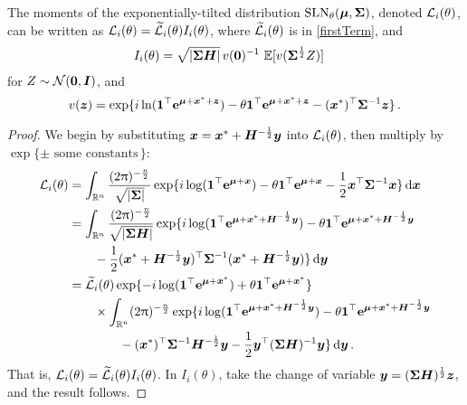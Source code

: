 \begin{subappendices}
\begin{proposition} \label{prop:laplace_derivatives}
The moments of the exponentially-tilted distribution $\mathrm{SLN}_\theta(\bm{\mu}, \bm{\Sigma})$, denoted $\mathcal{L}_i(\theta)$, can be written as $\mathcal{L}_i(\theta) = \widetilde{\mathcal{L}}_i(\theta) I_i(\theta)$, where $\widetilde{\mathcal{L}}_i(\theta)$ is in \eqref{firstTerm}, and
\begin{align*}
	I_i(\theta) &= \sqrt{|\bm{\Sigma} \bm{H}|} \, v(\bm{0})^{-1} \, \operatorname{{\mathbb E}}[v(\bm{\Sigma}^{\frac12} Z)]
\end{align*}
for $Z \sim \mathcal{N}(\bm{0}, \bm{I})$, and
\[ v(\bm{z}) = \exp\{ i \ln(\bm{1}^\top \bm{\mathrm{e}}^{\bm{\mu} + \bm{x}^* + \bm{z}}) - \theta \bm{1}^\top \bm{\mathrm{e}}^{\bm{\mu} + \bm{x}^* + \bm{z}} - (\bm{x}^*)^\top \bm{\Sigma}^{-1} \bm{z} \} \,. \]
\end{proposition}
\begin{proof}
We begin by substituting $\bm{x} = \bm{x}^* + \bm{H}^{-\frac12} \bm{y}$ into $\mathcal{L}_i(\theta)$, then multiply by $\exp\{ \pm \text{ some constants}\,\}$:
\begin{align*}
	\Laplace_i(\theta) &= \int_{\RL^n} \frac{ (2\pi)^{-\frac{n}{2}} }{\sqrt{|\bfSigma|}} \exp\{ i \log(\bfone^\tr \ve^{\bfmu + \bfx}) - \theta \bfone^\tr \ve^{\bfmu + \bfx} - \frac12 \bfx^\tr \bfSigma^{-1} \bfx \}  \dif \bfx \\
	&= \int_{\RL^n} \frac{ (2\pi)^{-\frac{n}{2}} }{\sqrt{|\bfSigma \bfH|}} \exp\{ i \log(\bfone^\tr \ve^{\bfmu + \bfx^* + \bfH^{-\frac12} \bfy}) - \theta \bfone^\tr \ve^{\bfmu + \bfx^* + \bfH^{-\frac12} \bfy} \\
	&\qquad - \frac12 (\bfx^* + \bfH^{-\frac12} \bfy)^\tr \bfSigma^{-1} (\bfx^* + \bfH^{-\frac12} \bfy) \}  \dif \bfy \\
	&= \widetilde{\Laplace}_i(\theta) \exp\{ -i \log(\bfone^\tr \ve^{\bfmu + \bfx^*}) + \theta \bfone^\tr \ve^{\bfmu + \bfx^*} \} \\
	&\qquad \times \int_{\RL^n} (2\pi)^{-\frac{n}{2}} \exp\{ i \log(\bfone^\tr \ve^{\bfmu + \bfx^* + \bfH^{-\frac12} \bfy}) - \theta \bfone^\tr \ve^{\bfmu + \bfx^* + \bfH^{-\frac12} \bfy} \\
	&\qquad\qquad -(\bfx^*)^\tr \bfSigma^{-1} \bfH^{-\frac12} \bfy - \frac12 \bfy^\tr (\bfSigma \bfH)^{-1} \bfy \}  \dif \bfy \,.
\end{align*}
That is, $\mathcal{L}_i(\theta) = \widetilde{\mathcal{L}}_i(\theta) I_i(\theta)$. In $I_i(\theta)$, take the change of variable $\bm{y} = (\bm{\Sigma}\bm{H})^{\frac12} \bm{z}$, and the result follows.

\end{proof}
\end{subappendices}

